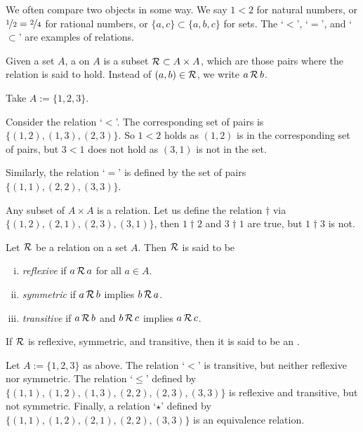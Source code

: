 We often compare two objects in some way.  We say $1 < 2$
for natural numbers, or $\nicefrac{1}{2} = \nicefrac{2}{4}$ for rational
numbers, or $\{ a,c \} \subset \{ a,b,c \}$ for sets.  The `$<$', `$=$', and
`$\subset$' are examples of
relations.

\begin{defn}
Given a set $A$, a \emph{} on $A$
is a subset ${\mathcal{R}} \subset A \times A$,
which are those pairs where the relation is said to hold.
Instead of $(a,b) \in {\mathcal{R}}$, we write
$a \, {\mathcal{R}} \, b$.
\end{defn}

\begin{example}
Take $A := \{ 1,2,3 \}$.

Consider the relation `$<$'.  The corresponding set 
of pairs is $\bigl\{ (1,2), (1,3), (2,3) \bigr\}$.  So $1 < 2$ holds as $(1,2)$
is in the corresponding set of pairs, but $3 < 1$ does not hold as $(3,1)$ is
not in the set.

Similarly, the relation `$=$'
is defined by the set of pairs $\bigl\{ (1,1), (2,2), (3,3) \big\}$.

Any subset of $A \times A$ is a relation.  Let us define the relation
$\dagger$ via $\bigl\{ (1,2), (2,1), (2,3), (3,1) \bigr\}$, then $1 \dagger 2$ and
$3 \dagger 1$ are
true, but $1 \dagger 3$ is not.
\end{example}

\pagebreak[2]
\begin{defn}
Let ${\mathcal{R}}$ be a relation on a set $A$.  Then ${\mathcal{R}}$ is said to be
\begin{enumerate}[(i)]
\item
\emph{reflexive} if $a\, {\mathcal{R}} \, a$ for
all $a \in A$.
\item
\emph{symmetric} if $a\, {\mathcal{R}} \, b$ implies
$b \, {\mathcal{R}} \, a$.
\item
\emph{transitive} if $a\, {\mathcal{R}} \, b$ and
$b \, {\mathcal{R}} \, c$ implies $a\, {\mathcal{R}} \, c$.
\end{enumerate}
If ${\mathcal{R}}$ is reflexive, symmetric, and transitive, then it is said to be
an \emph{}.
\end{defn}

\begin{example}
Let $A := \{ 1,2,3 \}$ as above.
The relation `$<$' is transitive, but neither reflexive nor symmetric.  The
relation `$\leq$' defined by
$\bigl\{ (1,1), (1,2), (1,3), (2,2), (2,3), (3,3) \bigr\}$
is reflexive and transitive, but not symmetric.
Finally, a relation `$\star$' defined by
$\bigl\{ (1,1), (1,2), (2,1), (2,2), (3,3) \bigr\}$ is
an equivalence relation.
\end{example}

